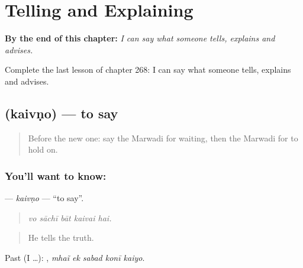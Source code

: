 
\chapter{Telling and Explaining}
\label{ch:mw-telling-and-explaining}

\begin{chapteropening}
\textbf{By the end of this chapter:} \emph{I can say what someone tells, explains and advises.}

Complete the last lesson of chapter 268: I can say what someone tells, explains and advises.
\end{chapteropening}

\section[\texorpdfstring{\mw{कैवणो} (kaivṇo)}{कैवणो (kaivṇo)}]{ (kaivṇo) — to say}

\label{lesson:MW-C268-kaivno}



\begin{quote}
Before the new one: say the Marwadi for waiting, then the Marwadi for to hold on.
\end{quote}

\subsection*{You'll want to know: }
\textbf{} — \emph{kaivṇo} — \textquotedblleft{}to say\textquotedblright{}.

\begin{quote}
    
\end{quote}

\begin{quote}
\emph{vo sāchī bāt kaivai hai.}
\end{quote}

\begin{quote}
He tells the truth.
\end{quote}

Past (I …):     , \emph{mhaĩ ek sabad konī kaiyo}.

